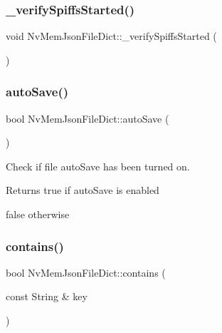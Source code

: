 \mbox{\label{class_nv_mem_json_file_dict_a938c2a2e731c5fce2bea5e8dec924e60}} 
\subsubsection{\texorpdfstring{\_verifySpiffsStarted()}{\_verifySpiffsStarted()}}
{\footnotesize\ttfamily void Nv\+Mem\+Json\+File\+Dict\+::\+\_\+verify\+Spiffs\+Started (\begin{DoxyParamCaption}{ }\end{DoxyParamCaption})\hspace{0.3cm}{\ttfamily [private]}}

\mbox{\label{class_nv_mem_json_file_dict_aa021fe277e0529adef47b80f82864f65}} 
\subsubsection{\texorpdfstring{autoSave()}{autoSave()}}
{\footnotesize\ttfamily bool Nv\+Mem\+Json\+File\+Dict\+::auto\+Save (\begin{DoxyParamCaption}{ }\end{DoxyParamCaption})}



Check if file auto\+Save has been turned on. 

\begin{DoxyReturn}{Returns}
true if auto\+Save is enabled 

false otherwise 
\end{DoxyReturn}
\mbox{\label{class_nv_mem_json_file_dict_af7e546ec407e5e07425b938a04ab8b6a}} 
\subsubsection{\texorpdfstring{contains()}{contains()}}
{\footnotesize\ttfamily bool Nv\+Mem\+Json\+File\+Dict\+::contains (\begin{DoxyParamCaption}\item[{const String \&}]{key }\end{DoxyParamCaption})\hspace{0.3cm}{\ttfamily [virtual]}}



